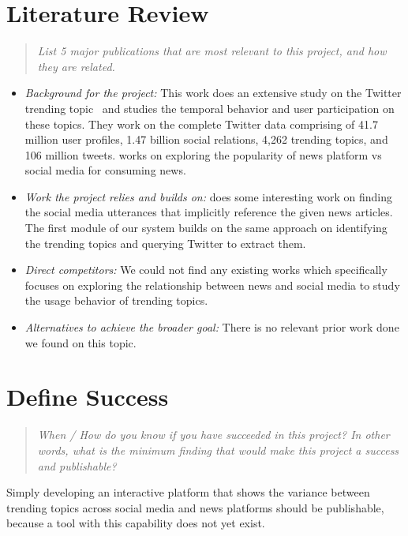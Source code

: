 \documentclass{proc}
\begin{document}
\section{Literature Review}
\begin{quote}

\emph{List 5 major publications that are most relevant to this project, and how they are related.}
\end{quote}

\begin{itemize}
\item \emph{Background for the project:} This work does an extensive study on the Twitter trending topic~\cite{kwak2010twitter} and studies the 
temporal behavior and user participation on these topics. They work on the complete Twitter data comprising of 41.7 million
user profiles, 1.47 billion social relations, 4,262 trending topics, and 106 million tweets. \cite{hermida2012share}
works on exploring the popularity of news platform vs social media for consuming news.
 
\item \emph{Work the project relies and builds on: } \cite{tsagkias2011linking} does some interesting work 
on finding the social media utterances that implicitly reference the given news articles. The first module of our system builds on
the same approach on identifying the trending topics and querying Twitter to extract them.

\item \emph{Direct competitors: } We could not find any existing works which specifically focuses on exploring the relationship between
news and social media to study the usage behavior of trending topics.

\item \emph{Alternatives to achieve the broader goal: } There is no relevant prior work done we found on this topic.

 \end{itemize}


\section{Define Success}
\begin{quote}
\emph{When / How do you know if you have succeeded in this project?
In other words, what is the minimum finding that would make this project a success and publishable?}
\end{quote}

Simply developing an interactive platform that shows the variance between trending topics across social media and news platforms should be publishable, because a tool with this capability does not yet exist.
\end{document}
